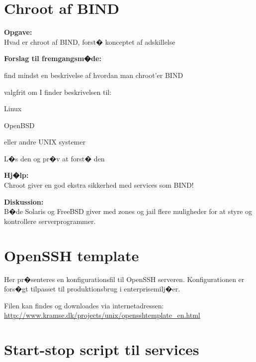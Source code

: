 \documentclass[a4paper,11pt,notitlepage]{oevelser}
\begin{document}
\chapter{Chroot af BIND}
\label{ex:bind-chroot}


{\bfseries Opgave:}\\
Hvad er chroot af BIND, forst� konceptet af adskillelse

{\bfseries Forslag til fremgangsm�de:}\\
\begin{list1}
\item find mindst en beskrivelse af hvordan man chroot'er BIND
\item valgfrit om I finder beskrivelsen til:
  \begin{list2}
    \item Linux
\item OpenBSD
\item eller andre UNIX systemer
  \end{list2}
\item L�s den og pr�v at forst� den
\end{list1}

{\bfseries Hj�lp:}\\
Chroot giver en god ekstra sikkerhed med services som BIND!

{\bfseries Diskussion:}\\
B�de Solaris og FreeBSD giver med zones og jail flere muligheder for
at styre og kontrollere serverprogrammer.



\appendix
\rhead{\fancyplain{}{\bfseries\leftmark}}
\normal

\chapter{OpenSSH template}

Her pr�senteres en konfigurationsfil til OpenSSH
serveren. Konfigurationen er fors�gt tilpasset til produktionsbrug i
enterprisemilj�er.

Filen kan findes og downloades via internetadressen:\\
\url{http://www.kramse.dk/projects/unix/opensshtemplate_en.html}






\chapter{Start-stop script til services}
\end{document}
